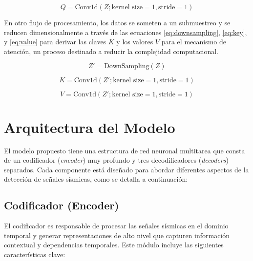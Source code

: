 \begin{equation}
Q = \text{Conv1d}(Z; \text{kernel size} = 1, \text{stride} = 1)
\label{eq:query}
\end{equation}

En otro flujo de procesamiento, los datos se someten a un submuestreo y se reducen dimensionalmente a través de las ecuaciones \ref{eq:downsampling}, \ref{eq:key}, y \ref{eq:value} para derivar las claves $K$ y los valores $V$ para el mecanismo de atención, un proceso destinado a reducir la complejidad computacional.

\begin{equation}
Z' = \text{DownSampling}(Z)
\label{eq:downsampling}
\end{equation}

\begin{equation}
K = \text{Conv1d}(Z'; \text{kernel size} = 1, \text{stride} = 1)
\label{eq:key}
\end{equation}

\begin{equation}
V = \text{Conv1d}(Z'; \text{kernel size} = 1, \text{stride} = 1)
\label{eq:value}
\end{equation}


\section{Arquitectura del Modelo}

El modelo propuesto tiene una estructura de red neuronal multitarea que consta de un codificador (\textit{encoder}) muy profundo y tres decodificadores (\textit{decoders}) separados. Cada componente está diseñado para abordar diferentes aspectos de la detección de señales sísmicas, como se detalla a continuación:

\subsection{Codificador (Encoder)}

El codificador es responsable de procesar las señales sísmicas en el dominio temporal y generar representaciones de alto nivel que capturen información contextual y dependencias temporales. Este módulo incluye las siguientes características clave:


